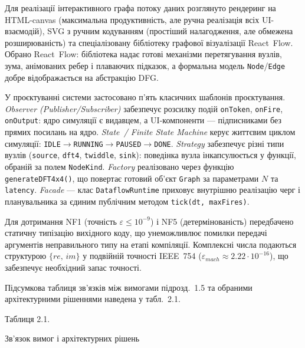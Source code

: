 Для реалізації інтерактивного графа потоку даних розглянуто рендеринг
на HTML-canvas (максимальна продуктивність, але ручна реалізація всіх
UI-взаємодій), SVG з ручним кодуванням (простіший налагодження, але
обмежена розширюваність) та спеціалізовану бібліотеку графової
візуалізації React~Flow. Обрано React~Flow: бібліотека надає готові
механізми перетягування вузлів, зума, анімованих ребер і плаваючих
підказок, а формальна модель \texttt{Node}/\texttt{Edge} добре
відображається на абстракцію DFG.

У проєктуванні системи застосовано п'ять класичних шаблонів
проєктування. \emph{Observer (Publisher/Subscriber)} забезпечує розсилку
подій \texttt{onToken}, \texttt{onFire}, \texttt{onOutput}: ядро
симуляції є видавцем, а UI-компоненти --- підписниками без прямих
посилань на ядро. \emph{State~/ Finite State Machine} керує життєвим
циклом симуляції:
\texttt{IDLE}\(\rightarrow\)\texttt{RUNNING}\(\rightarrow\)\texttt{PAUSED}\(\rightarrow\)\texttt{DONE}.
\emph{Strategy} забезпечує різні типи вузлів (\texttt{source},
\texttt{dft4}, \texttt{twiddle}, \texttt{sink}): поведінка вузла
інкапсулюється у функції, обраній за полем \texttt{NodeKind}. \emph{Factory}
реалізовано через функцію \texttt{generateDFT4x4()}, що повертає готовий
об'єкт \texttt{Graph} за параметрами \(N\) та \texttt{latency}.
\emph{Facade} --- клас \texttt{DataflowRuntime} приховує внутрішню
реалізацію черг і планувальника за єдиним публічним методом
\texttt{tick(dt,~maxFires)}.

Для дотримання NF1 (точність \(\varepsilon \leq 10^{-9}\)) і NF5
(детермінованість) передбачено статичну типізацію вихідного коду, що
унеможливлює помилки передачі аргументів неправильного типу на етапі
компіляції. Комплексні числа подаються структурою \(\{re,\,im\}\) у
подвійній точності IEEE~754 (\(\varepsilon_{mach} \approx 2.22 \cdot 10^{-16}\)),
що забезпечує необхідний запас точності.

Підсумкова таблиця зв'язків між вимогами підрозд.~1.5 та обраними
архітектурними рішеннями наведена у табл.~2.1.

Таблиця 2.1.

Зв'язок вимог і архітектурних рішень

